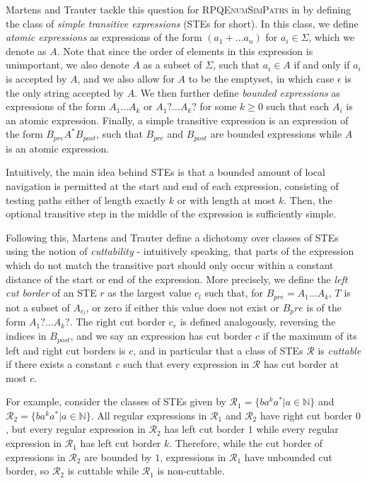 \documentclass{article}
\begin{document}
Martens and Trauter tackle this question for \textsc{RPQEnumSimPaths} in \cite{martensEvaluationEnumerationProblems2018} by defining the class of \emph{simple transitive expressions} (STEs for short). In this class, we define \emph{atomic expressions} as expressions of the form $(a_1 + \dots a_n)$ for $a_i \in \Sigma$, which we denote as $A$. Note that since the order of elements in this expression is unimportant, we also denote $A$ as a subset of $\Sigma$, such that $a_i \in A$ if and only if $a_i$ is accepted by $A$, and we also allow for $A$ to be the emptyset, in which case $\epsilon$ is the only string accepted by $A$. We then further define \emph{bounded expressions} as expressions of the form $A_1 \dots A_k$ or $A_1 ? \dots A_k ?$ for some $k \geq 0$ such that each $A_i$ is an atomic expression. Finally, a simple transitive expression is an expression of the form $B_{pre}A^* B_{post}$, such that $B_{pre}$ and $B_{post}$ are bounded expressions while $A$ is an atomic expression.

Intuitively, the main idea behind STEs is that a bounded amount of local navigation is permitted at the start and end of each expression, consisting of testing paths either of length exactly $k$ or with length at most $k$. Then, the optional transitive step in the middle of the expression is sufficiently simple.

Following this, Martens and Trauter define a dichotomy over classes of STEs using the notion of \emph{cuttability} - intuitively speaking, that parts of the expression which do not match the transitive part should only occur within a constant distance of the start or end of the expression. More precisely, we define the \emph{left cut border} of an STE $r$ as the largest value $c_l$ such that, for $B_{pre} = A_1 \dots A_k$, $T$ is not a subset of $A_{c_l}$, or zero if either this value does not exist or $B_pre$ is of the form $A_1 ? \dots A_k ?$. The right cut border $c_r$ is defined analogously, reversing the indices in $B_{post}$, and we say an expression has cut border $c$ if the maximum of its left and right cut borders is $c$, and in particular that a class of STEs $\mathcal{R}$ is \emph{cuttable} if there exists a constant $c$ such that every expression in $\mathcal{R}$ has cut border at most $c$.

For example, consider the classes of STEs given by $\mathcal{R}_1 = \{ ba^k a^* | a \in \mathbb{N} \}$ and $\mathcal{R}_2 = \{ ba^k a^* | a \in \mathbb{N} \}$. All regular expressions in $\mathcal{R}_1$ and $\mathcal{R}_2$ have right cut border $0$, but every regular expression in $\mathcal{R}_2$ has left cut border $1$ while every regular expression in $\mathcal{R}_1$ has left cut border $k$. Therefore, while the cut border of expressions in $\mathcal{R}_2$ are bounded by $1$, expressions in $\mathcal{R}_1$ have unbounded cut border, so $\mathcal{R}_2$ is cuttable while $\mathcal{R}_1$ is non-cuttable.
\end{document}
